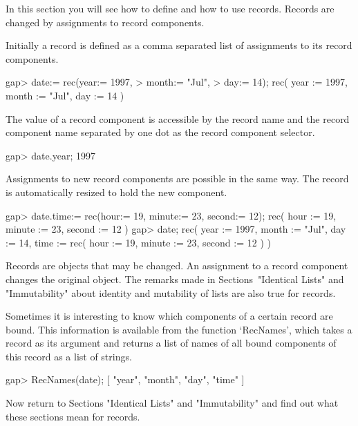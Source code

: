In this section you will see how to define and how to use records.
Records are changed by assignments to record components.

Initially a record is defined as a comma separated list of assignments to
its record components.

\beginexample
gap> date:= rec(year:= 1997,
>               month:= "Jul",
>               day:= 14);
rec(
  year := 1997,
  month := "Jul",
  day := 14 )
\endexample

The value of a record component is accessible by  the record name and the
record  component name separated   by one dot   as  the record  component
selector.

\beginexample
gap> date.year;
1997
\endexample

Assignments to new record components  are possible in  the same way.  The
record is automatically resized to hold the new component.

\beginexample
gap> date.time:= rec(hour:= 19, minute:= 23, second:= 12);
rec(
  hour := 19,
  minute := 23,
  second := 12 )
gap> date;
rec(
  year := 1997,
  month := "Jul",
  day := 14,
  time := rec(
      hour := 19,
      minute := 23,
      second := 12 ) )
\endexample

Records are objects  that  may be  changed.   An assignment to  a  record
component  changes the original  object.
The remarks made in Sections~"Identical Lists" and "Immutability"
about identity and mutability of lists are also true for records.

Sometimes it is interesting to know which  components of a certain record
are  bound.  This information is available  from the function `RecNames',
which  takes a record as  its  argument and  returns  a list of names of
all bound components of this record as a list of strings.

\beginexample
gap> RecNames(date);
[ "year", "month", "day", "time" ]
\endexample

%

Now return to Sections "Identical Lists"  and "Immutability" and find out
what these sections mean for records.

